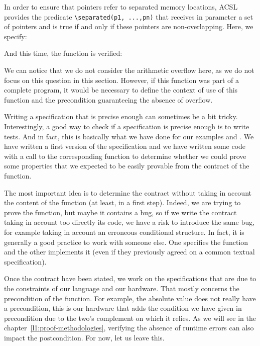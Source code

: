 In order to ensure that pointers refer to separated memory locations,
ACSL provides the predicate
\texttt{\textbackslash{}separated(p1,\ ...,pn)} that receives in
parameter a set of pointers and is true if and only if these pointers are
non-overlapping. Here, we specify:






And this time, the function is verified:





We can notice that we do not consider the arithmetic overflow here, as
we do not focus on this question in this section. However, if this
function was part of a complete program, it would be necessary to define
the context of use of this function and the precondition guaranteeing
the absence of overflow.




Writing a specification that is precise enough can sometimes be a bit tricky.
Interestingly, a good way to check if a specification is precise enough is to
write tests. And in fact, this is basically what we have done for our examples
 and . We have written a first version of the
specification and we have written some code with a call to the corresponding
function to determine whether we could prove some properties that we expected to
be easily provable from the contract of the function.



The most important
idea is to determine the contract without taking in account the content of the
function (at least, in a first step). Indeed, we are trying to prove the
function, but maybe it contains a bug, so if we write the contract taking in
account too directly its code, we have a risk to introduce the same bug, for
example taking in account an erroneous conditional structure. In fact, it is
generally a good practice to work with someone else. One specifies the function
and the other implements it (even if they previously agreed on a common textual
specification).



Once the contract have been stated, we work on the specifications that are due
to the constraints of our language and our hardware. That mostly concerns the
precondition of the function. For example, the absolute value does not really
have a precondition, this is our hardware that adds the condition we have given
in precondition due to the two's complement on which it relies. As we will see
in the chapter~\ref{l1:proof-methodologies}, verifying the absence of runtime
errors can also impact the postcondition. For now, let us leave this.



